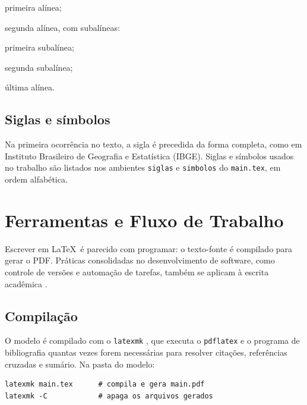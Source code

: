 \documentclass[
	12pt, %
	openright, %
	oneside, %
	a4paper, %
	sumario=tradicional, %
	english, %
	brazil, %
]{abntex2}
\begin{document}
\begin{alineas}
	\item primeira alínea;
	\item segunda alínea, com subalíneas:
	\begin{subalineas}
		\item primeira subalínea;
		\item segunda subalínea;
	\end{subalineas}
	\item última alínea.
\end{alineas}

\section{Siglas e símbolos}\label{sec:siglas}

Na primeira ocorrência no texto, a sigla é precedida da forma completa, como em Instituto Brasileiro de Geografia e Estatística (IBGE). Siglas e símbolos usados no trabalho são listados nos ambientes \texttt{siglas} e \texttt{simbolos} do \texttt{main.tex}, em ordem alfabética.
\chapter{Ferramentas e Fluxo de Trabalho}\label{cap:ferramentas}

Escrever em \LaTeX\ é parecido com programar: o texto-fonte é compilado para gerar o PDF. Práticas consolidadas no desenvolvimento de software, como controle de versões e automação de tarefas, também se aplicam à escrita acadêmica \cite{wilson2017}.

\section{Compilação}\label{sec:compilacao}

O modelo é compilado com o \texttt{latexmk} \cite{latexmk}, que executa o \texttt{pdflatex} e o programa de bibliografia quantas vezes forem necessárias para resolver citações, referências cruzadas e sumário. Na pasta do modelo:

\begin{verbatim}
latexmk main.tex      # compila e gera main.pdf
latexmk -C            # apaga os arquivos gerados
\end{verbatim}
\end{document}
